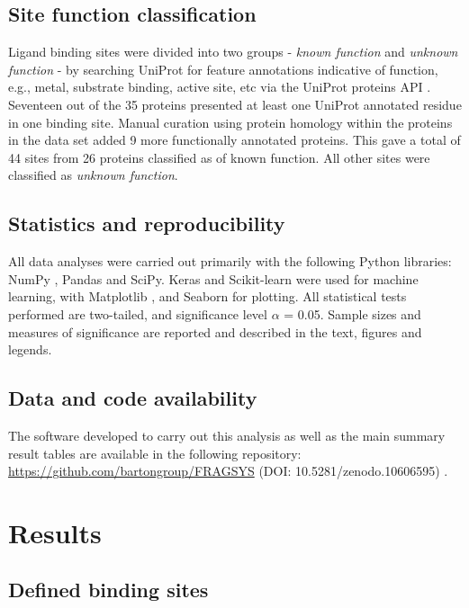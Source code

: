\subsection{Site function classification}

Ligand binding sites were divided into two groups - \textit{known function} and \textit{unknown function} - by searching UniProt \cite{UNIPROT_2019_UNIPROT} for feature annotations indicative of function, e.g., metal, substrate binding, active site, etc via the UniProt proteins API \cite{NIGHTINGALE_2017_API}. Seventeen out of the 35 proteins presented at least one UniProt annotated residue in one binding site. Manual curation using protein homology within the proteins in the data set added 9 more functionally annotated proteins. This gave a total of 44 sites from 26 proteins classified as of known function. All other sites were classified as \textit{unknown function}.

\subsection{Statistics and reproducibility}

All data analyses were carried out primarily with  the following Python libraries: NumPy \cite{HARRIS_2020_NUMPY}, Pandas \cite{MCKINNEY_2010_PANDAS,PANDAS_2022_PANDAS} and SciPy. Keras and Scikit-learn were used for machine learning, with Matplotlib \cite{HUNTER_2007_MATPLOTLIB}, and Seaborn \cite{WASKOM_2021_SEABORN} for plotting. All statistical tests performed are two-tailed, and significance level $\alpha$ = 0.05. Sample sizes and measures of significance are reported and described in the text, figures and legends.

\subsection{Data and code availability}

The software developed to carry out this analysis as well as the main summary result tables are available in the following repository: \url{https://github.com/bartongroup/FRAGSYS} (DOI: 10.5281/zenodo.10606595) \cite{UTGES_2024_FRAGSYS_ZENODO}.

\section{Results}

\subsection{Defined binding sites}

